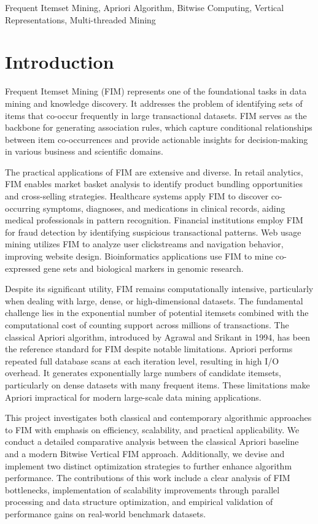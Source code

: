 \documentclass[conference]{IEEEtran}
\begin{document}
\begin{IEEEkeywords}
Frequent Itemset Mining, Apriori Algorithm, Bitwise Computing, Vertical Representations, Multi-threaded Mining
\end{IEEEkeywords}

\section{Introduction}

Frequent Itemset Mining (FIM) represents one of the foundational tasks in data mining and knowledge discovery. It addresses the problem of identifying sets of items that co-occur frequently in large transactional datasets. FIM serves as the backbone for generating association rules, which capture conditional relationships between item co-occurrences and provide actionable insights for decision-making in various business and scientific domains.

The practical applications of FIM are extensive and diverse. In retail analytics, FIM enables market basket analysis to identify product bundling opportunities and cross-selling strategies. Healthcare systems apply FIM to discover co-occurring symptoms, diagnoses, and medications in clinical records, aiding medical professionals in pattern recognition. Financial institutions employ FIM for fraud detection by identifying suspicious transactional patterns. Web usage mining utilizes FIM to analyze user clickstreams and navigation behavior, improving website design. Bioinformatics applications use FIM to mine co-expressed gene sets and biological markers in genomic research.

Despite its significant utility, FIM remains computationally intensive, particularly when dealing with large, dense, or high-dimensional datasets. The fundamental challenge lies in the exponential number of potential itemsets combined with the computational cost of counting support across millions of transactions. The classical Apriori algorithm, introduced by Agrawal and Srikant in 1994, has been the reference standard for FIM despite notable limitations. Apriori performs repeated full database scans at each iteration level, resulting in high I/O overhead. It generates exponentially large numbers of candidate itemsets, particularly on dense datasets with many frequent items. These limitations make Apriori impractical for modern large-scale data mining applications.

This project investigates both classical and contemporary algorithmic approaches to FIM with emphasis on efficiency, scalability, and practical applicability. We conduct a detailed comparative analysis between the classical Apriori baseline and a modern Bitwise Vertical FIM approach. Additionally, we devise and implement two distinct optimization strategies to further enhance algorithm performance. The contributions of this work include a clear analysis of FIM bottlenecks, implementation of scalability improvements through parallel processing and data structure optimization, and empirical validation of performance gains on real-world benchmark datasets.
\end{document}
